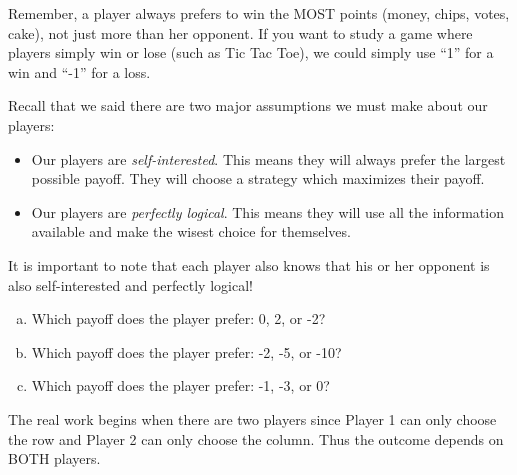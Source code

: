 Remember, a player always prefers to win the MOST points (money, chips, votes, cake), not just more than her opponent. If you want to study a game where players simply win or lose (such as Tic Tac Toe), we could simply use ``1'' for a win and ``-1'' for a loss. 

Recall that we said there are two major assumptions we must make about our players:
\begin{itemize}
\item Our players are \emph{self-interested}. This means they will always prefer the largest  possible payoff. They will choose a strategy which maximizes their payoff.
\item Our players are \emph{perfectly logical}. This means they will use all the information available and make the wisest choice for themselves.
\end{itemize}
It is important to note that each player also knows that his or her opponent is also self-interested and perfectly logical!

\begin{xca}
\begin{enumerate}[(a)]
\item Which payoff does the player prefer: 0, 2, or -2?
\item Which payoff does the player prefer: -2, -5, or -10?
\item Which payoff does the player prefer: -1, -3, or 0?
\end{enumerate}
\end{xca}


The real work begins when there are two players since Player 1 can only choose the row and Player 2 can only choose the column. Thus the outcome depends on BOTH players. 


